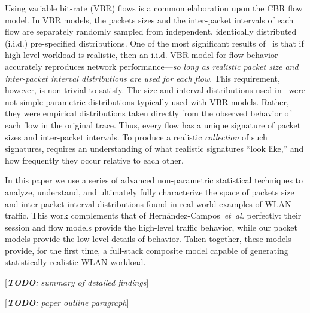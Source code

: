 \documentclass[conference]{IEEEtran}
\newcommand{\caps}[1]{{\small{#1}}}
\newcommand{\todo}[1]{[\textit{\textbf{TODO}: {#1}}]}
\begin{document}
Using variable bit-rate (\caps{VBR}) flows is a common elaboration upon the \caps{CBR} flow model. In \caps{VBR} models, the packets sizes and the inter-packet intervals of each flow are separately randomly sampled from independent, identically distributed (i.i.d.) pre-specified distributions.
One of the most significant results of~\cite{Karpinski07:realism} is that if high-level workload is realistic, then an i.i.d. \caps{VBR} model for flow behavior accurately reproduces network performance---\textit{so long as realistic packet size and inter-packet interval distributions are used for each flow}. This requirement, however, is non-trivial to satisfy. The size and interval distributions used in~\cite{Karpinski07:realism} were not simple parametric distributions typically used with \caps{VBR} models. Rather, they were empirical distributions taken directly from the observed behavior of each flow in the original trace. Thus, every flow has a unique signature of packet sizes and inter-packet intervals. To produce a realistic \textit{collection} of such signatures, requires an understanding of what realistic signatures ``look like,'' and how frequently they occur relative to each other.

In this paper we use a series of advanced non-parametric statistical techniques
to analyze, understand, and ultimately fully characterize the space of packets size and inter-packet interval distributions found in real-world examples of \caps{WLAN} traffic. This work complements that of Hern\'andez-Campos~\textit{et~al.} perfectly: their session and flow models provide the high-level traffic behavior, while our packet models provide the low-level details of behavior. Taken together, these models provide, for the first time, a full-stack composite model capable of generating statistically realistic \caps{WLAN} workload.

\todo{summary of detailed findings}

\todo{paper outline paragraph}

\end{document}
